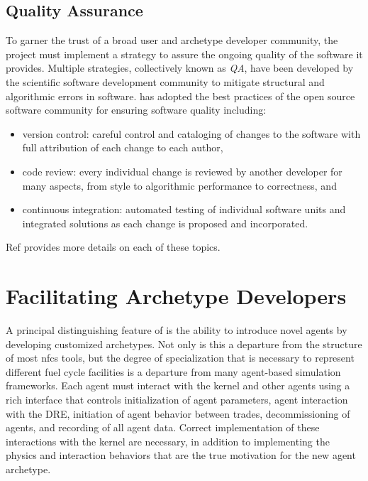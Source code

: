 \subsection{Quality Assurance}

To garner the trust of a broad user and archetype developer community, the
\Cyclus project must implement a strategy to assure the ongoing quality of the
software it provides.  Multiple strategies, collectively known as
\emph{\gls{QA}}, have been developed by the scientific software development
community to mitigate structural and algorithmic errors in software.  \Cyclus
has adopted the best practices of the open source software community for
ensuring software quality including:
\begin{itemize}
\item version control: careful control and cataloging of changes to the
  software with full attribution of each change to each author,
\item code review: every individual change is reviewed by another developer
  for many aspects, from style to algorithmic performance to correctness, and
\item continuous integration: automated testing of individual software units
  and integrated solutions as each change is proposed and incorporated.
\end{itemize}
Ref  provides more details on each of these topics.


\section{Facilitating Archetype Developers} %
\label{sec:archetypes}

A principal distinguishing feature of \Cyclus is the ability to introduce
novel agents by developing customized archetypes.  Not only is this a
departure from the structure of most \gls{nfcs} tools, but
the degree of specialization that is necessary to represent different fuel
cycle facilities is a departure from many agent-based simulation frameworks.
Each agent must interact with the \Cyclus kernel and other agents using a rich
interface that controls initialization of agent parameters, agent interaction
with the \gls{DRE}, initiation of agent behavior between trades,
decommissioning of agents, and recording of all agent data.  Correct
implementation of these interactions with the kernel are necessary, in
addition to implementing the physics and interaction behaviors that are the
true motivation for the new agent archetype.

